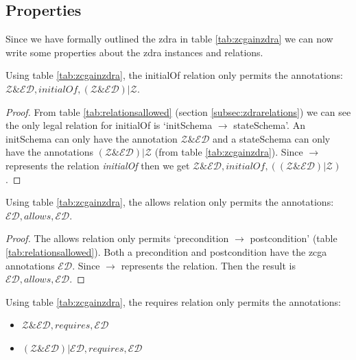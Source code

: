 \subsection{Properties}

Since we have formally outlined the \gls{zdra} in table \ref{tab:zcgainzdra} we
can now write some properties about the \gls{zdra} instances and relations.

\begin{thm}
Using table \ref{tab:zcgainzdra}, the initialOf relation only permits the
annotations: \\
 $\mathcal{Z} \& \mathcal{ED}, initialOf, (\mathcal{Z} \& \mathcal{ED}) |
 \mathcal{Z}$.
\end{thm}

\begin{proof}
From table \ref{tab:relationsallowed} (section \ref{subsec:zdrarelations}) we
can see the only legal relation for initialOf is `initSchema $\longrightarrow$
stateSchema'. An initSchema can only have the annotation $\mathcal{Z} \&
\mathcal{ED}$ and a stateSchema can only have the annotations $(\mathcal{Z} \&
\mathcal{ED}) | \mathcal{Z}$ (from table \ref{tab:zcgainzdra}). Since
$\longrightarrow$ represents the relation \emph{initialOf} then we get
$\mathcal{Z} \& \mathcal{ED}, initialOf, ((\mathcal{Z} \& \mathcal{ED}) |
\mathcal{Z})$.
\end{proof}

\begin{thm}
Using table \ref{tab:zcgainzdra}, the allows relation only permits the
annotations: \\
$\mathcal{ED}, allows, \mathcal{ED}$.
\end{thm}

\begin{proof}
The allows relation only permits `precondition $\longrightarrow$ postcondition'
(table \ref{tab:relationsallowed}). Both a precondition and postcondition have
the \gls{zcga} annotations $\mathcal{ED}$. Since $\longrightarrow$ represents
the relation. Then the result is $\mathcal{ED}, allows, \mathcal{ED}$.
\end{proof}

\begin{thm}
Using table \ref{tab:zcgainzdra}, the requires relation only permits the
annotations:
\begin{itemize}
\item $\mathcal{Z} \& \mathcal{ED}, requires, \mathcal{ED}$
\item $(\mathcal{Z} \& \mathcal{ED}) | \mathcal{ED}, requires, \mathcal{ED}$
\end{itemize}
\end{thm}

